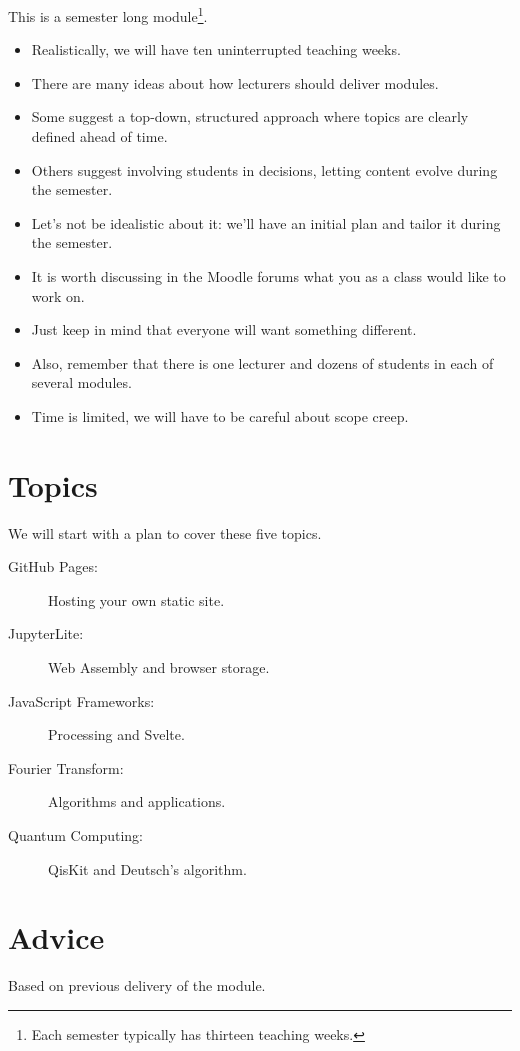 \documentclass[a4paper]{tufte-handout}
\begin{document}
This is a semester long module\footnote{Each semester typically has thirteen teaching weeks.}.
\begin{itemize}
  \item Realistically, we will have ten uninterrupted teaching weeks.
  \item There are many ideas about how lecturers should deliver modules.
  \item Some suggest a top-down, structured approach where topics are clearly defined ahead of time.
  \item Others suggest involving students in decisions, letting content evolve during the semester.
  \item Let's not be idealistic about it: we'll have an initial plan and tailor it during the semester.
  \item It is worth discussing in the Moodle forums what you as a class would like to work on.
  \item Just keep in mind that everyone will want something different.
  \item Also, remember that there is one lecturer and dozens of students in each of several modules.
  \item Time is limited, we will have to be careful about scope creep.
\end{itemize}
 
\section{Topics}

We will start with a plan to cover these five topics.

\begin{description}
  \item[GitHub Pages:] Hosting your own static site.
  \item[JupyterLite:] Web Assembly and browser storage.
  \item[JavaScript Frameworks:] Processing and Svelte. 
  \item[Fourier Transform:] Algorithms and applications.
  \item[Quantum Computing:] QisKit and Deutsch's algorithm.
\end{description}

\section{Advice}

Based on previous delivery of the module.
\end{document}
